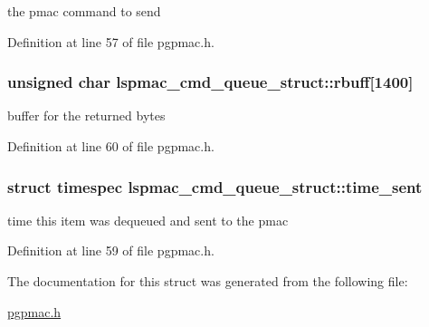the pmac command to send 

Definition at line 57 of file pgpmac.h.\hypertarget{structlspmac__cmd__queue__struct_aa059563886db174f9bb4f7a14bc19bbe}{
\subsubsection[{rbuff}]{\setlength{\rightskip}{0pt plus 5cm}unsigned char {\bf lspmac\_\-cmd\_\-queue\_\-struct::rbuff}\mbox{[}1400\mbox{]}}}
\label{structlspmac__cmd__queue__struct_aa059563886db174f9bb4f7a14bc19bbe}


buffer for the returned bytes 

Definition at line 60 of file pgpmac.h.\hypertarget{structlspmac__cmd__queue__struct_a276ebc4b35c2554e4cb7377b60fd89b7}{
\subsubsection[{time\_\-sent}]{\setlength{\rightskip}{0pt plus 5cm}struct timespec {\bf lspmac\_\-cmd\_\-queue\_\-struct::time\_\-sent}}}
\label{structlspmac__cmd__queue__struct_a276ebc4b35c2554e4cb7377b60fd89b7}


time this item was dequeued and sent to the pmac 

Definition at line 59 of file pgpmac.h.

The documentation for this struct was generated from the following file:\begin{DoxyCompactItemize}
\item 
\hyperlink{pgpmac_8h}{pgpmac.h}\end{DoxyCompactItemize}

